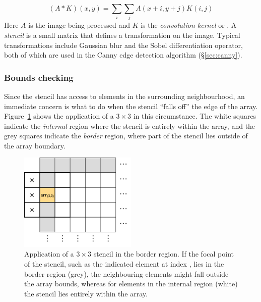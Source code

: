\begin{equation*}
    (A * K)(x, y) = \sum_i \sum_j A(x+i, y+j) K(i,j)
\end{equation*}
%
Here $A$ is the image being processed and $K$ is the \emph{convolution kernel}
or . A \emph{stencil} is a small matrix that defines a
transformation on the image. Typical transformations include Gaussian blur and
the Sobel differentiation operator, both of which are used in the Canny edge
detection algorithm (\S\ref{sec:canny}).


\subsubsection{Bounds checking}

Since the stencil has access to elements in the surrounding neighbourhood, an
immediate concern is what to do when the stencil ``falls off'' the edge of the
array. Figure~\ref{fig:stencil3x3} shows the application of a $3\times3$
 in this circumstance. The white squares indicate the
\emph{internal} region where the stencil is entirely within the array, and the
grey squares indicate the \emph{border} region, where part of the stencil lies
outside of the array boundary.

\begin{figure}[tbp]
    \begin{center}
        \includegraphics[width=0.5\textwidth]{images/basics/stencil3x3}
    \end{center}
    \caption[Application of a $3\times3$ stencil in the border region]
        {Application of a $3\times3$ stencil in the border region. If the focal
        point of the stencil, such as the indicated element at index
        , lies in the border region (grey), the neighbouring
        elements might fall outside the array bounds, whereas for elements in
        the internal region (white) the stencil lies entirely within the array.}
    \label{fig:stencil3x3}
\end{figure}

